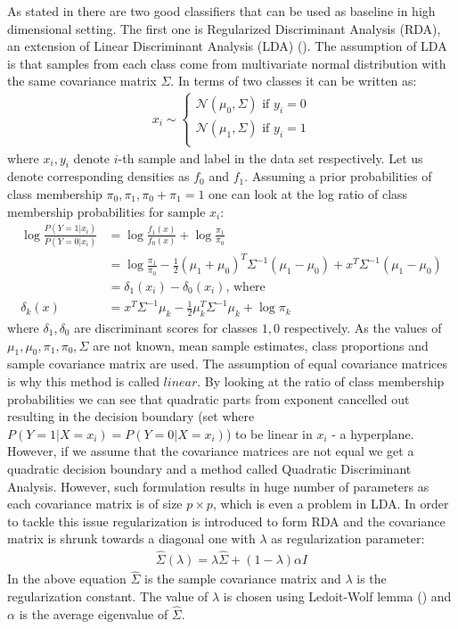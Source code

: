 \documentclass[shortabstract, english, mgr]{iithesis}
\begin{document}
As stated in \cite[chapter 18.2]{ESL2} there are two good classifiers that can be used as baseline in high dimensional setting. The first one is Regularized Discriminant Analysis (RDA), an extension of Linear Discriminant Analysis (LDA) (\cite[chapter 4.3]{ESL2}). The assumption of LDA is that samples from each class come from multivariate normal distribution with the same covariance matrix $\Sigma$. In terms of two classes it can be written as:
\begin{align*}
    x_i \sim \begin{cases}
    \mathcal{N}(\mu_0, \Sigma) \text{  if $y_i=0$} \\
    \mathcal{N}(\mu_1, \Sigma) \text{  if $y_i=1$} \\
    \end{cases}
\end{align*}
where $x_i, y_i$ denote $i$-th sample and label in the data set respectively. Let us denote corresponding densities as $f_0$ and $f_1$. Assuming a prior probabilities of class membership $\pi_0, \pi_1, \pi_0 + \pi_1=1$ one can look at the log ratio of class membership probabilities for sample $x_i$:
\begin{align} 
\log \frac{P(Y=1 | x_i)}{P(Y=0 | x_i)}&=\log \frac{f_1(x)}{f_{0}(x)}+\log \frac{\pi_1}{\pi_{0}} \nonumber \\&=\log \frac{\pi_1}{\pi_{0}}-\frac{1}{2}\left(\mu_1+\mu_{0}\right)^{T} \Sigma^{-1}\left(\mu_1-\mu_{0}\right) + x^{T} \Sigma^{-1}\left(\mu_1-\mu_{0}\right) \nonumber\\ &= \delta_1(x_i) - \delta_0(x_i) \text{, where} \nonumber\\
\delta_{k}(x)&=x^{T} \Sigma^{-1} \mu_{k}-\frac{1}{2} \mu_{k}^{T} \Sigma^{-1} \mu_{k}+\log \pi_{k} \label{eq:dslda}
\end{align}
where $\delta_1, \delta_0$ are discriminant scores for classes $1,0$ respectively. As the values of $\mu_1, \mu_0, \pi_1, \pi_0, \Sigma$ are not known, mean sample estimates, class proportions and sample covariance matrix are used. The assumption of equal covariance matrices is why this method is called $linear$. By looking at the ratio of class membership probabilities we can see that quadratic parts from exponent cancelled out resulting in the decision boundary (set where $P(Y=1 | X=x_i) = P(Y=0 | X=x_i)$) to be linear in $x_i$ - a hyperplane. However, if we assume that the covariance matrices are not equal we get a quadratic decision boundary and a method called Quadratic Discriminant Analysis. However, such formulation results in huge number of parameters as each covariance matrix is of size $p \times p$, which is even a problem in LDA. In order to tackle this issue regularization is introduced to form RDA and the covariance matrix is shrunk towards a diagonal one with $\lambda$ as regularization parameter:
\begin{align*}
    \hat{\Sigma}(\lambda)=\lambda \hat{\Sigma}+(1-\lambda) \alpha I
\end{align*}
In the above equation $\hat{\Sigma}$ is the sample covariance matrix and $\lambda$ is the regularization constant. The value of $\lambda$ is chosen using Ledoit-Wolf lemma (\cite{honey}) and $\alpha$ is the average eigenvalue of $\hat{\Sigma}$.
\end{document}
